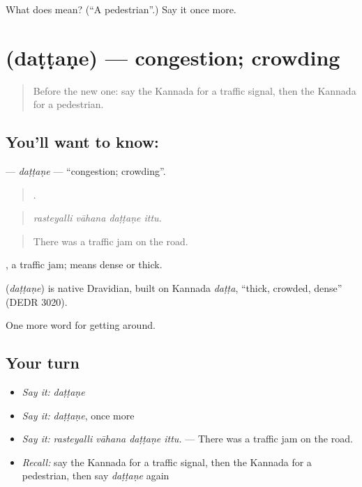 \begin{tcolorbox}[breakable,colback=teal!4,colframe=teal!35!black,title={Before you move on}]
What does  mean? (\textquotedblleft{}A pedestrian\textquotedblright{}.) Say it once more.
\end{tcolorbox}
\section[\texorpdfstring{\kn{ದಟ್ಟಣೆ} (daṭṭaṇe)}{ದಟ್ಟಣೆ (daṭṭaṇe)}]{ (daṭṭaṇe) — congestion; crowding}

\label{lesson:KA-C443-dattane}



\begin{quote}
Before the new one: say the Kannada for a traffic signal, then the Kannada for a pedestrian.
\end{quote}

\subsection*{You'll want to know: }
\textbf{} — \emph{daṭṭaṇe} — \textquotedblleft{}congestion; crowding\textquotedblright{}.

\begin{quote}
   .
\end{quote}

\begin{quote}
\emph{rasteyalli vāhana daṭṭaṇe ittu.}
\end{quote}

\begin{quote}
There was a traffic jam on the road.
\end{quote}

 , a traffic jam;  means dense or thick.

\begin{cousinweb}
\textbf{} (\emph{daṭṭaṇe}) is native Dravidian, built on Kannada \emph{daṭṭa}, \textquotedblleft{}thick, crowded, dense\textquotedblright{} (DEDR 3020).
\end{cousinweb}

\begin{grammarlens}[title={What you've built}]
One more word for getting around.
\end{grammarlens}

\subsection*{Your turn}
\begin{itemize}
\raggedright
  \item \emph{Say it:} \emph{daṭṭaṇe}
  \item \emph{Say it:} \emph{daṭṭaṇe}, once more
  \item \emph{Say it:} \emph{rasteyalli vāhana daṭṭaṇe ittu.} — There was a traffic jam on the road.
  \item \emph{Recall:} say the Kannada for a traffic signal, then the Kannada for a pedestrian, then say \emph{daṭṭaṇe} again
\end{itemize}

